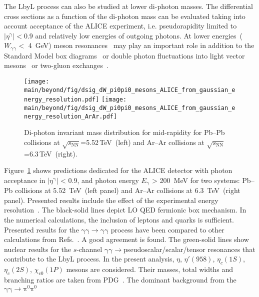 The LbyL process can also be studied at lower di-photon masses. The differential cross sections as a function of the di-photon mass can be evaluated taking into account acceptance of the ALICE experiment, i.e. pseudorapidity limited to $|\eta^{\mathrm{\gamma}}|<0.9$ and relatively low energies of outgoing photons. At lower energies~($W_{\mathrm{\gamma\gamma}} <$ 4~GeV) meson resonances~\cite{Klusek-Gawenda:2018ijg} may play an important role in addition to the Standard Model box diagrams~\cite{dEnterria:2013zqi,Klusek-Gawenda:2016euz}
or double photon fluctuations into light vector mesons~\cite{Klusek-Gawenda:2016euz} or two-gluon exchanges~\cite{Klusek-Gawenda:2016nuo}.
\begin{figure}[!h]
        \texttt{[image: \\main/beyond/fig/dsig\_dW\_pi0pi0\_mesons\_ALICE\_from\_gaussian\_energy\_resolution.pdf]}
        \texttt{[image: \\main/beyond/fig/dsig\_dW\_pi0pi0\_mesons\_ALICE\_from\_gaussian\_energy\_resolution\_ArAr.pdf]}
        \caption{
                Di-photon invariant mass distribution for mid-rapidity for Pb--Pb collisions at $\sqrt{s_{\mathrm{NN}}}$=5.52\,TeV~(left) and Ar--Ar collisions at $\sqrt{s_{\mathrm{NN}}}$=6.3\,TeV~(right).
        }
        \label{fig:lbyl_alice}
\end{figure}
Figure~\ref{fig:lbyl_alice} shows predictions dedicated for the ALICE detector with photon acceptance in $|\eta^{\mathrm{\gamma}}|$ < 0.9, and photon energy $E_{\mathrm{\gamma}}$ > 200~MeV for two systems: Pb--Pb collisions at 5.52~TeV~(left panel) and Ar--Ar collisions at 6.3~TeV~(right panel). Presented results include the effect of the experimental energy resolution~\cite{Acharya:2018yhg}. The black-solid lines depict LO QED fermionic box mechanism.
In the numerical calculations, the inclusion of leptons and quarks is sufficient. Presented results for the $\mathrm{\gamma\gamma\to\gamma\gamma}$ process have been compared to other calculations from Refs.~\cite{Jikia:1993tc,Bern:2001dg,Bardin:2009gq}. A good agreement is found. The green-solid lines show nuclear results for the $s$-channel $\mathrm{\gamma\gamma}\to$pseudoscalar/scalar/tensor resonances that contribute to the LbyL process.
In the present analysis, $\eta$, $\eta'(958)$, $\eta_c(1S)$, $\eta_c(2S)$, $\chi_{c0}(1P)$ mesons are considered.
Their masses, total widths and branching ratios are taken from PDG~\cite{Patrignani:2016xqp}.
The dominant background from the $\mathrm{\gamma\gamma\to\pi^0\pi^0}$
